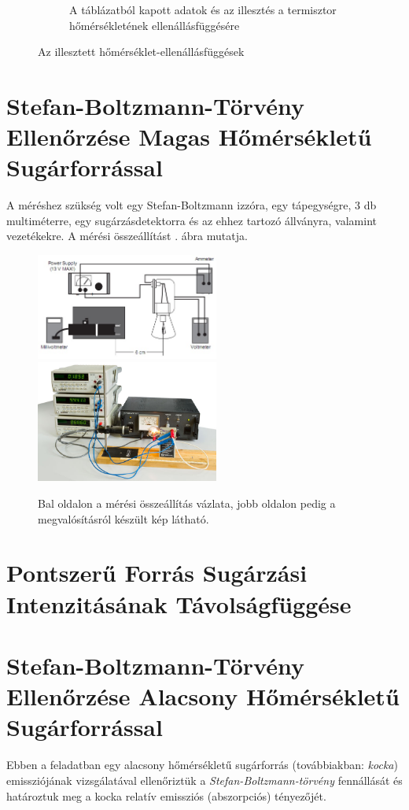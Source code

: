 \documentclass[a4paper, 12pt]{article}
\begin{document}
\begin{figure}[H]
\begin{subfigure}[b]{0.49\textwidth}
            \caption{A táblázatból kapott adatok és az illesztés a termisztor hőmérsékletének ellenállásfüggésére}
            \label{fig:1term}
        \end{subfigure}
        \caption{Az illesztett hőmérséklet-ellenállásfüggések}
        \label{fig:1ill}
    \end{figure}

    \section[Magas Hőmérsékletű Sugárforrás]{Stefan-Boltzmann-Törvény Ellenőrzése Magas Hőmérsékletű Sugárforrással}
    A méréshez szükség volt egy Stefan-Boltzmann izzóra, egy tápegységre, 3 db multiméterre, egy sugárzásdetektorra és az ehhez tartozó állványra, valamint vezetékekre.
    A mérési összeállítást . ábra mutatja.
    \begin{figure}
        \label{fig:2fel}
        \centering
        \includegraphics[width=6cm]{Mérési_elrendezés_1_homsug}
        \includegraphics[width=6cm]{Homsug8.jpg}
        \caption{Bal oldalon a mérési összeállítás vázlata, jobb oldalon pedig a megvalósításról készült kép látható.}
    \end{figure}

    \section[Intenzitás Távolságfüggése]{Pontszerű Forrás Sugárzási Intenzitásának Távolságfüggése}
    
    \section[Alacsony Hőmérsékletű Sugárforrás]{Stefan-Boltzmann-Törvény Ellenőrzése Alacsony Hőmérsékletű Sugárforrással}
    Ebben a feladatban egy alacsony hőmérsékletű sugárforrás (továbbiakban: \textit{kocka}) emissziójának vizsgálatával ellenőriztük a \textit{Stefan-Boltzmann-törvény} fennállását és határoztuk meg a kocka relatív emissziós (abszorpciós) tényezőjét.
\end{document}
